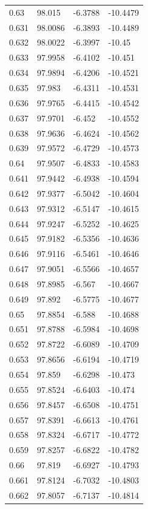 \begin{tabular}{llll}
0.63 & 98.015 & -6.3788 & -10.4479 \\
0.631 & 98.0086 & -6.3893 & -10.4489 \\
0.632 & 98.0022 & -6.3997 & -10.45 \\
0.633 & 97.9958 & -6.4102 & -10.451 \\
0.634 & 97.9894 & -6.4206 & -10.4521 \\
0.635 & 97.983 & -6.4311 & -10.4531 \\
0.636 & 97.9765 & -6.4415 & -10.4542 \\
0.637 & 97.9701 & -6.452 & -10.4552 \\
0.638 & 97.9636 & -6.4624 & -10.4562 \\
0.639 & 97.9572 & -6.4729 & -10.4573 \\
0.64 & 97.9507 & -6.4833 & -10.4583 \\
0.641 & 97.9442 & -6.4938 & -10.4594 \\
0.642 & 97.9377 & -6.5042 & -10.4604 \\
0.643 & 97.9312 & -6.5147 & -10.4615 \\
0.644 & 97.9247 & -6.5252 & -10.4625 \\
0.645 & 97.9182 & -6.5356 & -10.4636 \\
0.646 & 97.9116 & -6.5461 & -10.4646 \\
0.647 & 97.9051 & -6.5566 & -10.4657 \\
0.648 & 97.8985 & -6.567 & -10.4667 \\
0.649 & 97.892 & -6.5775 & -10.4677 \\
0.65 & 97.8854 & -6.588 & -10.4688 \\
0.651 & 97.8788 & -6.5984 & -10.4698 \\
0.652 & 97.8722 & -6.6089 & -10.4709 \\
0.653 & 97.8656 & -6.6194 & -10.4719 \\
0.654 & 97.859 & -6.6298 & -10.473 \\
0.655 & 97.8524 & -6.6403 & -10.474 \\
0.656 & 97.8457 & -6.6508 & -10.4751 \\
0.657 & 97.8391 & -6.6613 & -10.4761 \\
0.658 & 97.8324 & -6.6717 & -10.4772 \\
0.659 & 97.8257 & -6.6822 & -10.4782 \\
0.66 & 97.819 & -6.6927 & -10.4793 \\
0.661 & 97.8124 & -6.7032 & -10.4803 \\
0.662 & 97.8057 & -6.7137 & -10.4814 \\

\end{tabular}
